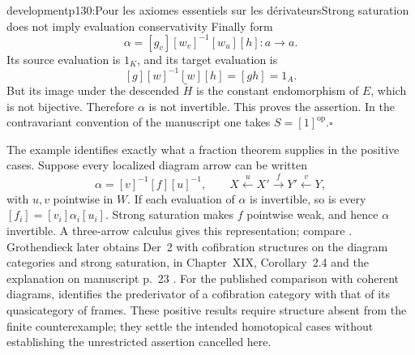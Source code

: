 \begin{dcomment}{development}{p130:Pour les axiomes essentiels sur les dérivateurs}{Strong saturation does not imply evaluation conservativity}
Finally form
\[
\alpha=[g_v][w_v]^{-1}[w_u][h]:a\longrightarrow a.
\]
Its source evaluation is $1_K$, and its target evaluation is
\[
[g][w]^{-1}[w][h]=[gh]=1_A.
\]
But its image under the descended $\widetilde H$ is the constant endomorphism of $E$, which is not bijective. Therefore $\alpha$ is not invertible. This proves the assertion. In the contravariant convention of the manuscript one takes $S=[1]^{\mathrm{op}}$.\hfill$\square$

The example identifies exactly what a fraction theorem supplies in the positive cases. Suppose every localized diagram arrow can be written
\[
\alpha=[v]^{-1}[f][u]^{-1},
\qquad X\xleftarrow{u}X'\xrightarrow{f}Y'
\xleftarrow{v}Y,
\]
with $u,v$ pointwise in $W$. If each evaluation of $\alpha$ is invertible, so is every $[f_i]=[v_i]\alpha_i[u_i]$. Strong saturation makes $f$ pointwise weak, and hence $\alpha$ invertible. A three-arrow calculus gives this representation; compare \citet[Proposition~4.1.11(ii)]{Low2013HomotopicalAlgebra}. Grothendieck later obtains Der~2 with cofibration structures on the diagram categories and strong saturation, in Chapter~XIX, Corollary~2.4 and the explanation on manuscript p.~23 \citep{Grothendieck1990XIX}. For the published comparison with coherent diagrams, \citet[Theorem~3.33]{Lenz2018} identifies the prederivator of a cofibration category with that of its quasicategory of frames. These positive results require structure absent from the finite counterexample; they settle the intended homotopical cases without establishing the unrestricted assertion cancelled here.
\end{dcomment}

